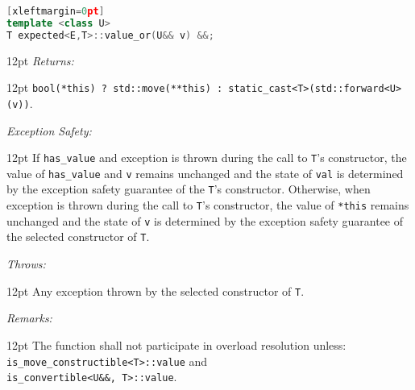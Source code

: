 \documentclass[a4paper,10pt]{article}
\newcommand{\cpp}[1]{\lstinline{#1}}
\newcommand{\wordingItem}[1]{\noindent\textit{#1:}}
\newenvironment{wordingTextItem}[1]{\wordingItem{#1}\vspace{2pt}\noindent\begin{adjustwidth}{12pt}{}}{\vspace{2pt}\end{adjustwidth}}
\newenvironment{wordingPara}{\begin{adjustwidth}{12pt}{}}{\end{adjustwidth}}
\begin{document}
\begin{lstlisting}[language=C++][xleftmargin=0pt]
template <class U>
T expected<E,T>::value_or(U&& v) &&; 
\end{lstlisting}
\begin{wordingPara}
\begin{wordingTextItem}{Returns}
\cpp{bool(*this) ? std::move(**this) : static_cast<T>(std::forward<U>(v))}.
\end{wordingTextItem}
\begin{wordingTextItem}{Exception Safety}
If \cpp{has_value} and exception is thrown during the call to \cpp{T}'s constructor, the value of \cpp{has_value} and \cpp{v} remains unchanged and the state of \cpp{val} is determined by the exception safety guarantee of the \cpp{T}'s constructor. Otherwise, when exception is thrown during the call to \cpp{T}'s constructor, the value of \cpp{*this} remains unchanged and the state of \cpp{v} is determined by the exception safety guarantee of the selected constructor of \cpp{T}.
\end{wordingTextItem}
\begin{wordingTextItem}{Throws}
Any exception thrown by the selected constructor of \cpp{T}.
\end{wordingTextItem}
\begin{wordingTextItem}{Remarks}
The function shall not participate in overload resolution unless: \\
\cpp{is_move_constructible<T>::value} and \\
\cpp{is_convertible<U&&, T>::value}.
\end{wordingTextItem}
\end{wordingPara}
\end{document}
